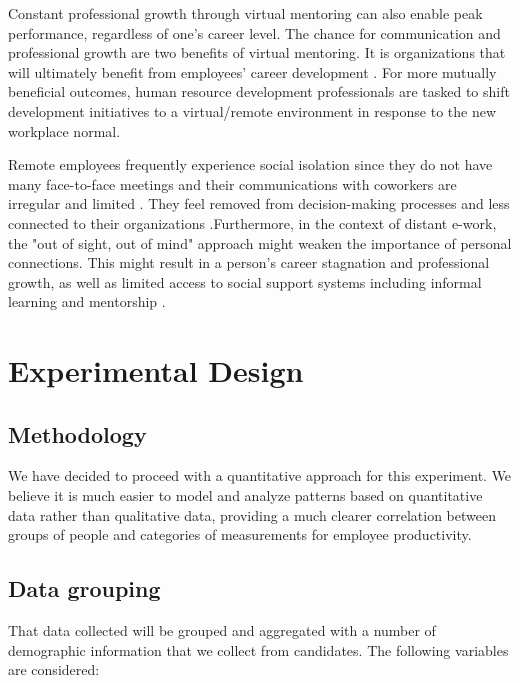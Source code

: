 \documentclass[12pt]{article}
\begin{document}
Constant professional growth through virtual mentoring can also enable peak performance, regardless of one's career level. The chance for communication and professional growth are two benefits of virtual mentoring. It is organizations that will ultimately benefit from employees’ career development \cite{Yarberry2021}.  For more mutually beneficial outcomes, human resource development professionals are tasked to shift development initiatives to a virtual/remote environment in response to the new workplace normal.

Remote employees frequently experience social isolation since they do not have many face-to-face meetings and their communications with coworkers are irregular and limited \cite{Park2021}. They feel removed from decision-making processes and less connected to their organizations \cite{Virick2010}.Furthermore, in the context of distant e-work, the "out of sight, out of mind" approach might weaken the importance of personal connections. This might result in a person's career stagnation and professional growth, as well as limited access to social support systems including informal learning and mentorship \cite{Smith2018}.


\section*{Experimental Design}

\subsection*{Methodology}
We have decided to proceed with a quantitative approach for this experiment. We believe it is much easier to model and analyze patterns based on quantitative data rather than qualitative data, providing a much clearer correlation between groups of people and categories of measurements for employee productivity.

\subsection*{Data grouping}

That data collected will be grouped and aggregated with a number of demographic information that we collect from candidates. The following variables are considered:
\end{document}
